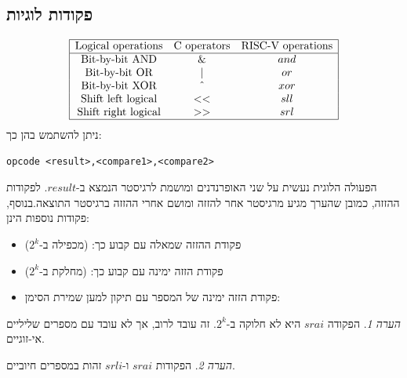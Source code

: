 \documentclass[12pt]{article}
\theoremstyle{plain}
\theoremstyle{definition}
\theoremstyle{remark}
\newtheorem*{remark}{הערה}                %
\begin{document}
\subsection{פקודות לוגיות}
\[
{\begin{array}{|ccc|}
\hline \text{Logical operations} & \text{C operators} & \text{RISC-V operations} \\
\hline \text{Bit-by-bit AND} & \& & and \\
\text{Bit-by-bit OR} & | & or \\
\text{Bit-by-bit XOR} & \hat{} & xor \\
\text{Shift left logical} & << & sll \\
\text{Shift right logical} & >> & srl \\
\hline
\end{array}}
\]
ניתן להשתמש בהן כך:\begin{LTR}\begin{lstlisting}[language=assembly]
opcode <result>,<compare1>,<compare2>

\end{lstlisting}\end{LTR}הפעולה הלוגית נעשית על שני האופרנדנים ומושמת לרגיסטר הנמצא ב-\({result}\).\newline{}
לפקודות ההזזה, כמובן שהערך מגיע מרגיסטר אחר להזזה ומושם אחרי ההזזה ברגיסטר התוצאה.בנוסף, פקודות נוספות הינן:\begin{itemize}
\item פקודת ההזזה שמאלה עם קבוע כך: (מכפילה ב-\({2^k}\))
\item פקודת הזזה ימינה עם קבוע כך: (מחלקת ב-\({2^k}\))
\item פקודת הזזה ימינה של המספר עם תיקון למען שמירת הסימן:
\end{itemize}
\begin{remark}
הפקודה \({srai}\) היא לא חלוקה ב-\({2^{k}}\).\newline{}
זה עובד לרוב, אך לא עובד עם מספרים שליליים אי-זוגיים.
\end{remark}
\begin{remark}
הפקודות \({srai}\) ו-\({srli}\) זהות במספרים חיוביים.
\end{remark}
\end{document}
